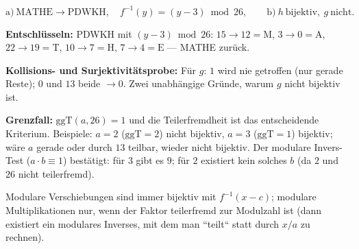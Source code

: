 \begin{ergebnis}
\begin{equation*}
  \text{a)}\ \text{MATHE}\to\text{PDWKH},\quad
  f^{-1}(y)=(y-3)\bmod26,\qquad
  \text{b)}\ h\ \text{bijektiv},\ g\ \text{nicht}.
\end{equation*}
\end{ergebnis}

\begin{kontrolle}
\textbf{Entschl\"usseln:} PDWKH mit $(y-3)\bmod26$: $15\to12=\mathrm M$,
$3\to0=\mathrm A$, $22\to19=\mathrm T$, $10\to7=\mathrm H$,
$7\to4=\mathrm E$ --- MATHE zur\"uck. \checkmark

\textbf{Kollisions- und Surjektivit\"atsprobe:} F\"ur $g$: $1$ wird nie
getroffen (nur gerade Reste); $0$ und $13$ beide $\to0$. Zwei unabh\"angige
Gr\"unde, warum $g$ nicht bijektiv ist.

\textbf{Grenzfall:} $\mathrm{ggT}(a,26)=1$ und die Teilerfremdheit ist das
entscheidende Kriterium. Beispiele: $a=2$ ($\mathrm{ggT}=2$) nicht
bijektiv, $a=3$ ($\mathrm{ggT}=1$) bijektiv; wäre $a$ gerade oder durch
$13$ teilbar, wieder nicht bijektiv. Der modulare Invers-Test
($a\cdot b\equiv1$) best\"atigt: f\"ur $3$ gibt es $9$; f\"ur $2$ existiert
kein solches $b$ (da $2$ und $26$ nicht teilerfremd).
\end{kontrolle}

\begin{merksatz}
Modulare Verschiebungen sind immer bijektiv mit $f^{-1}(x-c)$;
modulare Multiplikationen nur, wenn der Faktor teilerfremd zur Modulzahl
ist (dann existiert ein modulares Inverses, mit dem man ``teilt`` statt
durch $x/a$ zu rechnen).
\end{merksatz}
